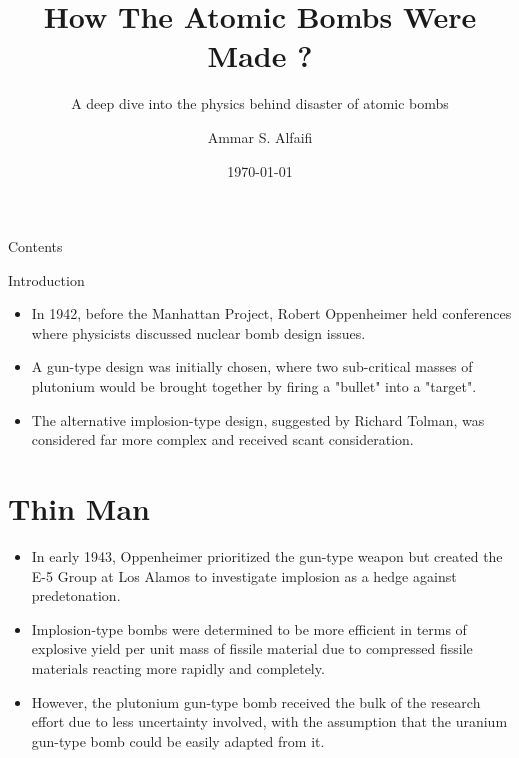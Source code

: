 \documentclass{loyola-beamer}
\title{How The Atomic Bombs Were Made ?}
\subtitle{A deep dive into the physics behind disaster of atomic bombs}
\author{Ammar S. Alfaifi}
\date{\today}
\institute{KFUPM}
\begin{document}
\begin{titleframe}{}
	\maketitle
\end{titleframe}

\begin{frame}{Contents}
	\tableofcontents
\end{frame}

\begin{frame}{Introduction}
\end{frame}

\begin{frame}
	\begin{itemize}
		\item In 1942, before the Manhattan Project, Robert Oppenheimer held conferences where physicists discussed nuclear bomb design issues.
		\item A gun-type design was initially chosen, where two sub-critical masses of plutonium would be brought together by firing a "bullet" into a "target".
		\item The alternative implosion-type design, suggested by Richard Tolman, was considered far more complex and received scant consideration.
	\end{itemize}
\end{frame}

\section{Thin Man}

\begin{frame}
	\begin{itemize}
		\item In early 1943, Oppenheimer prioritized the gun-type weapon but created the E-5 Group at Los Alamos to investigate implosion as a hedge against predetonation.
		\item Implosion-type bombs were determined to be more efficient in terms of explosive yield per unit mass of fissile material due to compressed fissile materials reacting more rapidly and completely.
		\item However, the plutonium gun-type bomb received the bulk of the research effort due to less uncertainty involved, with the assumption that the uranium gun-type bomb could be easily adapted from it.
	\end{itemize}
\end{frame}
\end{document}
